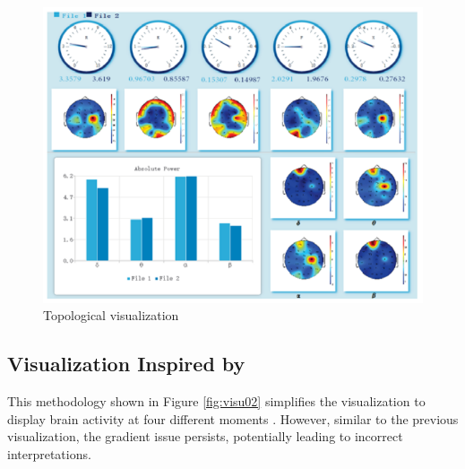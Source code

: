 \documentclass[format=sigconf]{acmart}
\begin{document}
			\begin{figure}[h]
				\centering
				\includegraphics[width=\linewidth]{../presentation/images/visu01}
				\caption{Topological visualization}
				\label{fig:visu01}
			\end{figure}
	
		\subsection{Visualization Inspired by \cite{8937083}}
			\par This methodology shown in Figure \ref{fig:visu02} simplifies the visualization to display brain activity at four different moments \cite{8937083}. However, similar to the previous visualization, the gradient issue persists, potentially leading to incorrect interpretations.
			
\end{document}
